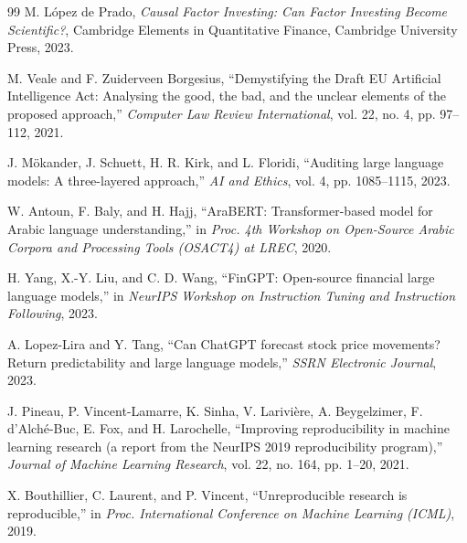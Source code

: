\documentclass[conference]{IEEEtran}
\begin{document}
\begin{thebibliography}{99}
M. L\'{o}pez de Prado, \textit{Causal Factor Investing: Can Factor Investing Become Scientific?}, Cambridge Elements in Quantitative Finance, Cambridge University Press, 2023.


M. Veale and F. Zuiderveen Borgesius, ``Demystifying the Draft EU Artificial Intelligence Act: Analysing the good, the bad, and the unclear elements of the proposed approach,'' \textit{Computer Law Review International}, vol. 22, no. 4, pp. 97--112, 2021.

J. M\"{o}kander, J. Schuett, H. R. Kirk, and L. Floridi, ``Auditing large language models: A three-layered approach,'' \textit{AI and Ethics}, vol. 4, pp. 1085--1115, 2023.


W. Antoun, F. Baly, and H. Hajj, ``AraBERT: Transformer-based model for Arabic language understanding,'' in \textit{Proc. 4th Workshop on Open-Source Arabic Corpora and Processing Tools (OSACT4) at LREC}, 2020.


H. Yang, X.-Y. Liu, and C. D. Wang, ``FinGPT: Open-source financial large language models,'' in \textit{NeurIPS Workshop on Instruction Tuning and Instruction Following}, 2023.

A. Lopez-Lira and Y. Tang, ``Can ChatGPT forecast stock price movements? Return predictability and large language models,'' \textit{SSRN Electronic Journal}, 2023.


J. Pineau, P. Vincent-Lamarre, K. Sinha, V. Larivi\`ere, A. Beygelzimer, F. d'Alch\'e-Buc, E. Fox, and H. Larochelle, ``Improving reproducibility in machine learning research (a report from the NeurIPS 2019 reproducibility program),'' \textit{Journal of Machine Learning Research}, vol. 22, no. 164, pp. 1--20, 2021.

X. Bouthillier, C. Laurent, and P. Vincent, ``Unreproducible research is reproducible,'' in \textit{Proc. International Conference on Machine Learning (ICML)}, 2019.


\end{thebibliography}
\end{document}
